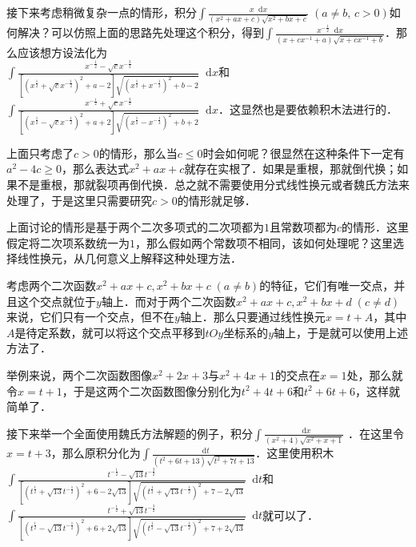 \documentclass{ctexbook}
\newcommand*{\dif}{\mathop{}\!\mathrm{d}}
\begin{document}
接下来考虑稍微复杂一点的情形，积分$\int\frac{x\dif{x}}{\left(x^{2}+ax+c\right)\sqrt{x^{2}+bx+c}}\;\left(a\ne b,\,c>0\right)$如何解决？可以仿照上面的思路先处理这个积分，得到$\int\frac{x^{-\frac{1}{2}}\dif{x}}{\left(x+cx^{-1}+a\right)\sqrt{x+cx^{-1}+b}}$．那么应该想方设法化为\\$\int\frac{x^{-\frac{1}{2}}-\sqrt{c}x^{-\frac{3}{2}}}{\left[\left(x^{\frac{1}{2}}+\sqrt{c}x^{-\frac{1}{2}}\right)^{2}+a-2\right]\sqrt{\left(x^{\frac{1}{2}}+x^{-\frac{1}{2}}\right)^{2}+b-2}}\dif{x}$和$\int\frac{x^{-\frac{1}{2}}+\sqrt{c}x^{-\frac{3}{2}}}{\left[\left(x^{\frac{1}{2}}-\sqrt{c}x^{-\frac{1}{2}}\right)^{2}+a+2\right]\sqrt{\left(x^{\frac{1}{2}}-x^{-\frac{1}{2}}\right)^{2}+b+2}}\dif{x}$．这显然也是要依赖积木法进行的．\par
上面只考虑了$c>0$的情形，那么当$c\le0$时会如何呢？很显然在这种条件下一定有$a^{2}-4c\ge0$，那么表达式$x^{2}+ax+c$就存在实根了．如果是重根，那就倒代换；如果不是重根，那就裂项再倒代换．总之就不需要使用分式线性换元或者魏氏方法来处理了，于是这里只需要研究$c>0$的情形就足够．\par
上面讨论的情形是基于两个二次多项式的二次项都为$1$且常数项都为$c$的情形．这里假定将二次项系数统一为$1$，那么假如两个常数项不相同，该如何处理呢？这里选择线性换元，从几何意义上解释这种处理方法．\par
考虑两个二次函数$x^{2}+ax+c,x^{2}+bx+c\;\left(a\ne b\right)$的特征，它们有唯一交点，并且这个交点就位于$y$轴上．而对于两个二次函数$x^{2}+ax+c,x^{2}+bx+d\;\left(c\ne d\right)$来说，它们只有一个交点，但不在$y$轴上．那么只要通过线性换元$x=t+A$，其中$A$是待定系数，就可以将这个交点平移到$tOy$坐标系的$y$轴上，于是就可以使用上述方法了．\par
举例来说，两个二次函数图像$x^{2}+2x+3$与$x^{2}+4x+1$的交点在$x=1$处，那么就令$x=t+1$，于是这两个二次函数图像分别化为$t^{2}+4t+6$和$t^{2}+6t+6$，这样就简单了．\par
接下来举一个全面使用魏氏方法解题的例子，积分$\int\frac{\dif{x}}{\left(x^{2}+4\right)\sqrt{x^{2}+x+1}}$
．在这里令$x=t+3$，那么原积分化为$\int\frac{\dif{t}}{\left(t^{2}+6t+13\right)\sqrt{t^{2}+7t+13}}$．这里使用积木$\int\frac{t^{-\frac{1}{2}}-\sqrt{13}t^{-\frac{3}{2}}}{\left[\left(t^{\frac{1}{2}}+\sqrt{13}t^{-\frac{1}{2}}\right)^{2}+6-2\sqrt{13}\right]\sqrt{\left(t^{\frac{1}{2}}+\sqrt{13}t^{-\frac{1}{2}}\right)^{2}+7-2\sqrt{13}}}\dif{t}$和$\int\frac{t^{-\frac{1}{2}}+\sqrt{13}t^{-\frac{3}{2}}}{\left[\left(t^{\frac{1}{2}}-\sqrt{13}t^{-\frac{1}{2}}\right)^{2}+6+2\sqrt{13}\right]\sqrt{\left(t^{\frac{1}{2}}-\sqrt{13}t^{-\frac{1}{2}}\right)^{2}+7+2\sqrt{13}}}\dif{t}$就可以了．\par
\end{document}
